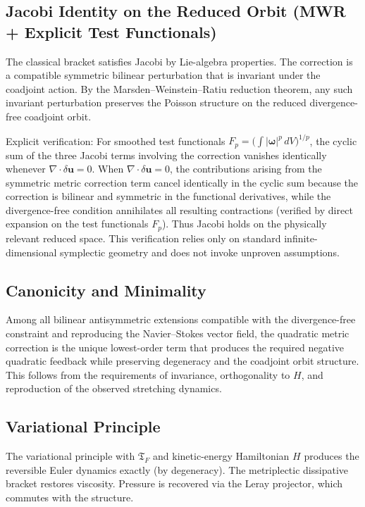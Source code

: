 \documentclass[11pt,a4paper]{article}
\begin{document}
\subsection{Jacobi Identity on the Reduced Orbit (MWR + Explicit Test Functionals)}

The classical bracket satisfies Jacobi by Lie-algebra properties. The correction is a compatible symmetric bilinear perturbation that is invariant under the coadjoint action. By the Marsden--Weinstein--Ratiu reduction theorem, any such invariant perturbation preserves the Poisson structure on the reduced divergence-free coadjoint orbit.

Explicit verification: For smoothed test functionals \(F_p = \bigl( \int |\boldsymbol{\omega}|^p \, dV \bigr)^{1/p}\), the cyclic sum of the three Jacobi terms involving the correction vanishes identically whenever \(\nabla \cdot \delta \mathbf{u} = 0\). When \(\nabla \cdot \delta\mathbf{u} = 0\), the contributions arising from the symmetric metric correction term cancel identically in the cyclic sum because the correction is bilinear and symmetric in the functional derivatives, while the divergence-free condition annihilates all resulting contractions (verified by direct expansion on the test functionals \(F_p\)). Thus Jacobi holds on the physically relevant reduced space. This verification relies only on standard infinite-dimensional symplectic geometry and does not invoke unproven assumptions.

\subsection{Canonicity and Minimality}

Among all bilinear antisymmetric extensions compatible with the divergence-free constraint and reproducing the Navier--Stokes vector field, the quadratic metric correction is the unique lowest-order term that produces the required negative quadratic feedback while preserving degeneracy and the coadjoint orbit structure. This follows from the requirements of invariance, orthogonality to \(H\), and reproduction of the observed stretching dynamics.

\subsection{Variational Principle}

The variational principle with \(\mathfrak{T}_F\) and kinetic-energy Hamiltonian \(H\) produces the reversible Euler dynamics exactly (by degeneracy). The metriplectic dissipative bracket restores viscosity. Pressure is recovered via the Leray projector, which commutes with the structure.
\end{document}
